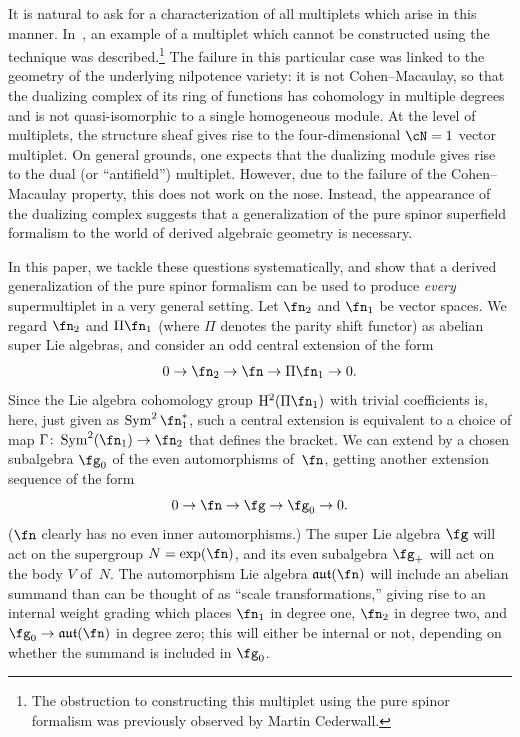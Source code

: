 \documentclass[10pt,a4paper]{amsart}
\numberwithin{equation}{section}
\def\lie#1{\ensuremath{\mathfrak{#1}}}
\def\aut{\ensuremath{\lie{aut}}}
\DeclareMathOperator{\Sym}{Sym}
\begin{document}
It is natural to ask for a characterization of all multiplets which arise in this manner.
In~\cite{perspectives}, an example of a multiplet which cannot be constructed using the technique was described.\footnote{The obstruction to constructing this multiplet using the pure spinor formalism was previously observed by Martin Cederwall.} The failure in this particular case was linked to the geometry of the underlying nilpotence variety: it is not Cohen--Macaulay, so that the dualizing complex of its ring of functions has cohomology in multiple degrees and is not quasi-isomorphic to a single homogeneous module. At the level of multiplets, the structure sheaf gives rise to the four-dimensional $\cN = 1$ vector multiplet. On general grounds, one expects that the dualizing module gives rise to
the dual (or ``antifield'') multiplet.
However, due to the failure of the Cohen--Macaulay property, this does not work on the nose. Instead, the appearance of the dualizing complex suggests that a generalization of the pure spinor superfield formalism to the world of derived algebraic geometry is necessary.

In this paper, we tackle these questions systematically, and show that a derived generalization of the pure spinor formalism can be used to produce \emph{every} supermultiplet in a very general setting.
Let $\fn_2$ and $\fn_1$ be vector spaces. We regard $\fn_2$ and $\Pi \fn_1$ (where $\Pi$ denotes the parity shift functor) as abelian super Lie algebras, and consider an odd central extension of the form
\begin{equation} \label{eq:ext1}
	0 \to \fn_2 \to \fn \to \Pi\fn_1 \to 0.
\end{equation}
Since the Lie algebra cohomology group $\mathrm H^2(\Pi \fn_1)$ with trivial coefficients is, here, just given as $\Sym^2 \fn_1^*$, such a central extension is equivalent to a choice of map $\Gamma \colon \Sym^2(\fn_1) \to \fn_2$ that defines the bracket.
We can extend by a chosen subalgebra $\fg_0$ of the even automorphisms of~$\fn$, getting another extension sequence of the form
\begin{equation*}
	0 \to \fn \to \fg \to \fg_0 \to 0.
\end{equation*}
($\fn$ clearly has no even inner automorphisms.) The super Lie algebra $\fg$ will act on the supergroup $N = \exp(\fn)$, and its even subalgebra $\fg_+$ will act on the body $V$ of~$N$. The automorphism Lie algebra $\aut(\fn)$ will include an abelian summand than can be thought of as ``scale transformations,'' giving rise to an internal weight grading which places $\fn_1$ in degree one, $\fn_2$ in degree two, and $\fg_0 \to \aut(\fn)$ in degree zero; this will either be internal or not, depending on whether the summand is included in $\fg_0$.
\end{document}
